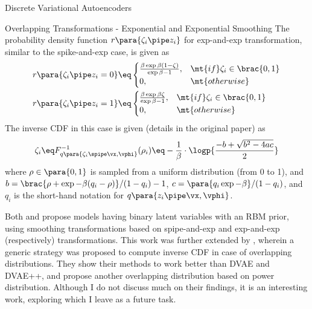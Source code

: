 \documentclass{article}
\newcommand{\qp}{q\para}
\newcommand{\rp}{r\para}
\begin{document}
\begin{psection}{Discrete Variational Autoencoders}
\begin{psubsection}{Overlapping Transformations - Exponential and Exponential Smoothing}
		The probability density function $\rp{\zeta_i \pipe z_i}$ for exp-and-exp transformation, similar to the spike-and-exp case, is given as
		\begin{align}
			\rp{\zeta_i \pipe z_i = 0}	&\eq \begin{cases}
				\frac{\beta \exp{\beta (1 - \zeta)}}{\exp{\beta} - 1},	& \mt{if} \zeta_i \in \brac{0, 1} \\
				0,		& \mt{otherwise}
			\end{cases} \nonumber \\
			\rp{\zeta_i \pipe z_i = 1}	&\eq \begin{cases}
				\frac{\beta \exp{\beta \zeta}}{\exp{\beta} - 1},	& \mt{if} \zeta_i \in \brac{0, 1} \\
				0,													& \mt{otherwise}
			\end{cases}
			\label{eq:spike-and-exp:pdf}
		\end{align}
		The inverse CDF in this case is given (details in the original paper) as
		\begin{align}
			\zeta_i \eq F_{\qp{\zeta_i \spipe \vx, \vphi}}^{-1}(\rho_i)	\eq - \frac{1}{\beta} \cdot \logp{\frac{-b + \sqrt{b^2 - 4ac}}2}
			\label{eq:spike-and-exp:icdf}
		\end{align}
		where $\rho \in \para{0, 1}$ is sampled from a uniform distribution (from 0 to 1), and $b = \brac{\rho + \exp{-\beta}(q_i - \rho)} / (1 - q_i) - 1$, $c = \para{q_i \exp{- \beta}}/(1 - q_i)$, and $q_i$ is the short-hand notation for $\qp{z_i \pipe \vx, \vphi}$.

	\end{psubsection}

	Both \cite{dvae} and \cite{dvae-pp} propose models having binary latent variables with an RBM prior, using smoothing transformations based on spipe-and-exp and exp-and-exp (respectively) transformations. This work was further extended by \cite{dvae-sharp}, wherein a generic strategy was proposed to compute inverse CDF in case of overlapping distributions. They show their methods to work better than DVAE and DVAE++, and propose another overlapping distribution based on power distribution. Although I do not discuss much on their findings, it is an interesting work, exploring which I leave as a future task.

\end{psection}
\end{document}
